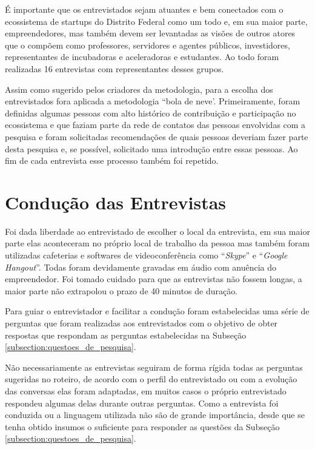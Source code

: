 É importante que os entrevistados sejam atuantes e bem conectados com o ecossistema de startups do Distrito Federal como um todo e, em sua maior parte, empreendedores, mas também devem ser levantadas as visões de outros atores que o compõem como professores, servidores e agentes públicos, investidores, representantes de incubadoras e aceleradoras e estudantes. Ao todo foram realizadas 16 entrevistas com representantes desses grupos.

Assim como sugerido pelos criadores da metodologia, para a escolha dos entrevistados fora aplicada a metodologia ``bola de neve'. Primeiramente, foram definidas algumas pessoas com alto histórico de contribuição e participação no ecossistema e que faziam parte da rede de contatos das pessoas envolvidas com a pesquisa e foram solicitadas recomendações de quais pessoas deveriam fazer parte desta pesquisa e, se possível, solicitado uma introdução entre essas pessoas. Ao fim de cada entrevista esse processo também foi repetido.

\section{Condução das Entrevistas}
\label{subsection:conducao_das_entrevistas}

Foi dada liberdade ao entrevistado de escolher o local da entrevista, em sua maior parte elas aconteceram no próprio local de trabalho da pessoa mas também foram utilizadas cafeterias e softwares de videoconferência como ``\textit{Skype}'' e ``\textit{Google Hangout}''. Todas foram devidamente gravadas em áudio com anuência do empreendedor. Foi tomado cuidado para que as entrevistas não fossem longas, a maior parte não extrapolou o prazo de 40 minutos de duração. 

Para guiar o entrevistador e facilitar a condução foram estabelecidas uma série de perguntas que foram realizadas aos entrevistados com o objetivo de obter respostas que respondam as perguntas estabelecidas na Subseção \ref{subsection:questoes_de_pesquisa}.

Não necessariamente as entrevistas seguiram de forma rígida todas as perguntas sugeridas no roteiro, de acordo com o perfil do entrevistado ou com a evolução das conversas elas foram adaptadas, em muitos casos o próprio entrevistado respondeu algumas delas durante outras perguntas. Como a entrevista foi conduzida ou a linguagem utilizada não são de grande importância, desde que se tenha obtido insumos o suficiente para responder as questões da Subseção \ref{subsection:questoes_de_pesquisa}.

